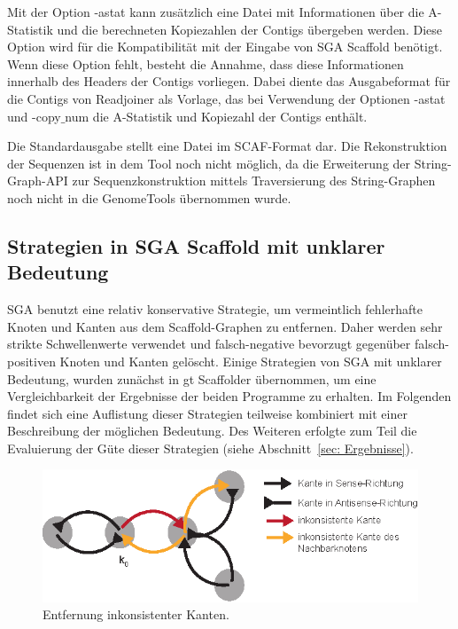 \documentclass[a4paper,11pt,parskip]{scrartcl}
\begin{document}
Mit der Option -astat kann zusätzlich eine Datei mit Informationen
über die A-Statistik und die berechneten Kopiezahlen der Contigs
übergeben werden. Diese Option wird für die Kompatibilität mit der
Eingabe von SGA Scaffold benötigt. Wenn diese Option fehlt, besteht die
Annahme, dass diese Informationen innerhalb des Headers der
Contigs vorliegen. Dabei diente das Ausgabeformat für die Contigs von
Readjoiner als Vorlage, das bei Verwendung der Optionen -astat und
-copy$\_$num die A-Statistik und Kopiezahl der Contigs enthält.

Die Standardausgabe stellt eine Datei im SCAF-Format dar. Die
Rekonstruktion der Sequenzen ist in dem Tool noch nicht möglich, da
die Erweiterung der String-Graph-API zur Sequenzkonstruktion mittels
Traversierung des String-Graphen noch nicht in die GenomeTools
übernommen wurde.

\subsection{Strategien in SGA Scaffold mit unklarer Bedeutung}
\label{sec: wunderlich}
SGA benutzt eine relativ konservative Strategie, um vermeintlich
fehlerhafte Knoten und Kanten aus dem Scaffold-Graphen zu
entfernen. Daher werden sehr strikte Schwellenwerte verwendet und
falsch-negative bevorzugt gegenüber falsch-positiven Knoten und Kanten
gelöscht. Einige Strategien von SGA mit unklarer Bedeutung, wurden
zunächst in gt Scaffolder übernommen, um eine Vergleichbarkeit der
Ergebnisse der beiden Programme zu erhalten. Im Folgenden findet sich
eine Auflistung dieser Strategien teilweise kombiniert mit einer
Beschreibung der möglichen Bedeutung. Des Weiteren erfolgte zum Teil
die Evaluierung der Güte dieser Strategien
(siehe Abschnitt~\ref{sec: Ergebnisse}).

\begin{figure}
  \centering
  \includegraphics[width=0.6\linewidth]{inkonsistenteKante.eps}
  \caption{Entfernung inkonsistenter Kanten.}
\label{abb: inkonsistenteKante}
\end{figure}
\end{document}
